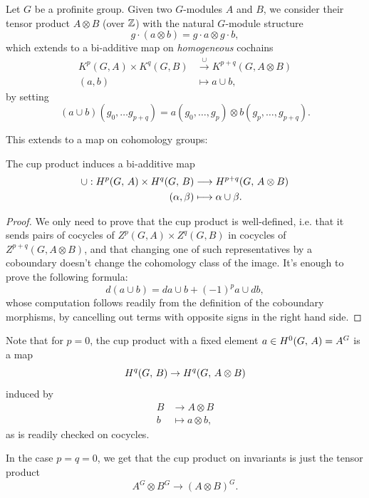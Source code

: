 \documentclass[a4paper, oneside]{memoir}
\begin{document}
Let $G$ be a profinite group. Given two $G$-modules $A$ and $B$, we consider their tensor product $A\otimes B$ (over $\mathbb{Z}$) with the natural $G$-module structure
\[
	g\cdot (a\otimes b)=g\cdot a\otimes g\cdot b,
\]
which extends to a bi-additive map on \textit{homogeneous} cochains
\begin{align*}
	K^p(G,A)\times K^q(G,B) & \overset{\cup}{\longrightarrow} K^{p+q}(G,A\otimes B) \\
	(a,b)                   & \mapsto a\cup b,
\end{align*}
by setting
\[
	(a\cup b)(g_0,\dots g_{p+q})=a(g_0,\dots,g_p)\otimes b(g_p,\dots,g_{p+q}).
\]

This extends to a map on cohomology groups:

\begin{theorem}\label{thm:Cup}
	The cup product induces a bi-additive map
	\begin{align*}
		\cup: H^{p}( G, \, A )\times H^{q}( G, \, B ) & \longrightarrow H^{p+q}( G, \, A\otimes B ) \\
		(\alpha,\beta)                     & \longmapsto \alpha\cup\beta.
	\end{align*}
\end{theorem}

\begin{proof}
	We only need to prove that the cup product is well-defined, i.e. that it sends pairs of cocycles of $Z^p(G,A)\times Z^q(G,B)$ in cocycles of $Z^{p+q}(G,A\otimes B)$, and that changing one of such representatives by a coboundary doesn't change the cohomology class of the image.
	It's enough to prove the following formula:
	\begin{equation}\label{eq:DiffCup}
		d(a\cup b)=da\cup b+(-1)^pa\cup d b,
	\end{equation}
	whose computation follows readily from the definition of the coboundary morphisms, by cancelling out terms with opposite signs in the right hand side.
\end{proof}

\begin{remark}\label{rm:Cup0n}
	Note that for $p=0$, the cup product with a fixed element $a\in H^{0}( G, \, A )=A^G$ is a map
	\[
		H^{q}( G, \, B )\to H^{q}( G, \, A\otimes B )
	\]
	induced by
	\begin{align*}
		B & \longrightarrow A\otimes B \\
		b & \longmapsto a\otimes b,
	\end{align*}
	as is readily checked on cocycles.

	In the case $p=q=0$, we get that the cup product on invariants is just the tensor product \[A^G\otimes B^G\to (A\otimes B)^G.\]
\end{remark}
\end{document}

